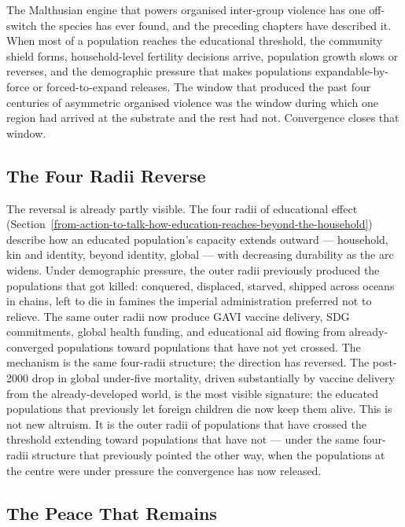 \documentclass[12pt,letterpaper]{article}
\begin{document}
The Malthusian engine that powers organised inter-group violence has
one off-switch the species has ever found, and the preceding chapters
have described it. When most of a population reaches the educational
threshold, the community shield forms, household-level fertility
decisions arrive, population growth slows or reverses, and the
demographic pressure that makes populations expandable-by-force or
forced-to-expand releases. The window that produced the past four
centuries of asymmetric organised violence was the window during which
one region had arrived at the substrate and the rest had not.
Convergence closes that window.

\subsection{The Four Radii Reverse}\label{the-four-radii-reverse}

The reversal is already partly visible. The four radii of educational
effect
(Section~\ref{from-action-to-talk-how-education-reaches-beyond-the-household})
describe how an educated population's capacity extends outward ---
household, kin and identity, beyond identity, global --- with
decreasing durability as the arc widens. Under demographic pressure,
the outer radii previously produced the populations that got killed:
conquered, displaced, starved, shipped across oceans in chains, left
to die in famines the imperial administration preferred not to
relieve. The same outer radii now produce GAVI vaccine delivery, SDG
commitments, global health funding, and educational aid flowing from
already-converged populations toward populations that have not yet
crossed. The mechanism is the same four-radii structure; the direction
has reversed. The post-2000 drop in global under-five mortality,
driven substantially by vaccine delivery from the already-developed
world, is the most visible signature: the educated populations that
previously let foreign children die now keep them alive. This is not
new altruism. It is the outer radii of populations that have crossed
the threshold extending toward populations that have not --- under the
same four-radii structure that previously pointed the other way, when
the populations at the centre were under pressure the convergence has
now released.

\subsection{The Peace That Remains}\label{the-peace-that-remains}
\end{document}
